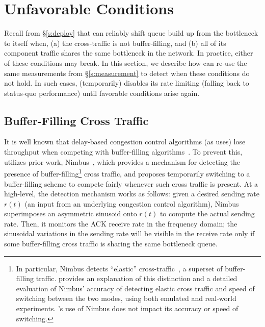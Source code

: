 \section{Unfavorable Conditions}\label{s:queue-ctl}

Recall from \S\ref{s:deploy} that \name can reliably shift queue build up from the bottleneck to itself when, (a) the cross-traffic is not buffer-filling, and (b) all of its component traffic shares the same bottleneck in the network.
In practice, either of these conditions may break. 
In this section, we describe how \name can re-use the same measurements from \S\ref{s:measurement} to detect when these conditions do not hold. In such cases, \name (temporarily) disables its rate limiting (falling back to status-quo performance) until favorable conditions arise again. 

\subsection{Buffer-Filling Cross Traffic}
\label{s:buffer-filling}


It is well known that delay-based congestion control algorithms (as \name uses) lose throughput when competing with buffer-filling algorithms~\cite{copa}. 
To prevent this, \name utilizes prior work, Nimbus~\cite{nimbus-arxiv}, which provides a mechanism for detecting the presence of buffer-filling\footnote{In particular, Nimbus detects ``elastic'' cross-traffic~\cite{nimbus-arxiv}, a superset of buffer-filling traffic. \cite{nimbus-arxiv} provides an explanation of this distinction
and a detailed evaluation of Nimbus' accuracy of detecting elastic cross traffic and speed of switching between the two modes, using both emulated and real-world experiments. \name{}'s use of Nimbus does not impact its accuracy or speed of switching.} 
cross traffic, and proposes temporarily switching to a buffer-filling scheme to compete fairly whenever such cross traffic is present.
At a high-level, the detection mechanism works as follows: given a desired sending rate $r(t)$ (an input from an underlying congestion control algorithm), Nimbus superimposes an asymmetric sinusoid onto $r(t)$ to compute the actual sending rate. Then, it monitors the ACK receive rate in the frequency domain; the sinusoidal variations in the sending rate will be visible in the receive rate only if some buffer-filling cross traffic is sharing the same bottleneck queue. 

